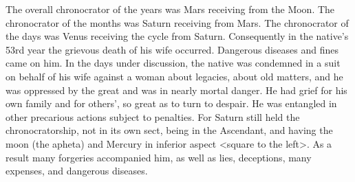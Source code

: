 The overall chronocrator of the years was Mars receiving from the Moon. The chronocrator of the months was Saturn receiving from Mars. The chronocrator of the days was Venus receiving the cycle from
Saturn. Consequently in the native’s 53rd year the grievous death of his wife occurred. Dangerous diseases and fines came on him. In the days under discussion, the native was condemned in a suit on behalf of his wife against a woman about legacies, about old matters, and he was oppressed by the great and was in nearly mortal danger. He had grief for his own family and for others’, so great as to turn to despair.
He was entangled in other precarious actions subject to penalties. For Saturn still held the chronocratorship, not in its own sect, being in the Ascendant, and having the moon (the apheta) and Mercury in inferior aspect <square to the left>. As a result many forgeries accompanied him, as well as lies, deceptions, many expenses, and dangerous diseases.


\newpage